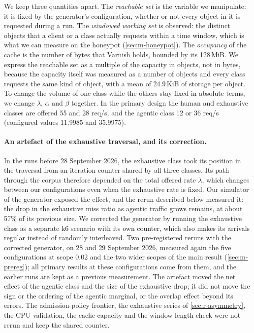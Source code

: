 We keep three quantities apart.
The \emph{reachable set} is the variable we manipulate: it is fixed by the generator's
configuration, whether or not every object in it is requested during a run.
The \emph{windowed working set} is observed: the distinct objects that a client or a class
actually requests within a time window, which is what we can measure on the honeypot
(\cref{sec:m-honeypot}).
The \emph{occupancy} of the cache is the number of bytes that Varnish holds, bounded by its
128\,MiB.
We express the reachable set as a multiple of the capacity in objects, not in bytes,
because the capacity itself was measured as a number of objects and every class requests
the same kind of object, with a mean of 24.9\,KiB of storage per object.
To change the volume of one class while the others stay fixed in absolute terms, we
change $\lambda$, $\alpha$ and $\beta$ together.
In the primary design the human and exhaustive classes are offered 55 and 28 req/s, and
the agentic class 12 or 36 req/s (configured values 11.9985 and 35.9975).

\paragraph{An artefact of the exhaustive traversal, and its correction.}
In the runs before 28 September 2026, the exhaustive class took its position in the
traversal from an iteration counter shared by all three classes.
Its path through the corpus therefore depended on the total offered rate $\lambda$, which
changes between our configurations even when the exhaustive rate is fixed.
Our simulator of the generator exposed the effect, and the rerun described below measured
it: the drop in the exhaustive miss ratio as agentic traffic grows remains, at about 57\% of
its previous size.
We corrected the generator by running the exhaustive class as a separate k6 scenario with
its own counter, which also makes its arrivals regular instead of randomly
interleaved.
Two pre-registered reruns with the corrected generator, on 28 and 29 September 2026,
measured again the five configurations at scope 0.02 and the two wider scopes of the
main result
(\cref{sec:m-prereg}); all primary results at these configurations come from them, and the
earlier runs are kept as a previous measurement.
The artefact moved the net effect of the agentic class and the size of the exhaustive
drop; it did not move the sign or the ordering of the agentic marginal, or the overlap
effect beyond its errors.
The admission-policy frontier, the exhaustive series of \cref{sec:r-asymmetry}, the CPU
validation, the cache capacity and the window-length check were not rerun and keep the
shared counter.

